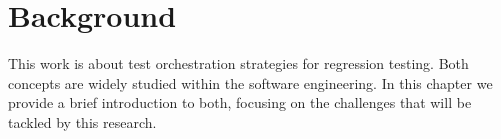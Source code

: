 \chapter{Background}\label{chap:background}

This work is about test orchestration strategies for regression testing.
Both concepts are widely studied within the software engineering.
In this chapter we provide a brief introduction to both, focusing on the challenges that will be tackled by this research.







